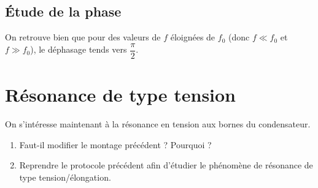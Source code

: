 \documentclass[a4paper,french,bookmarks]{article}
\begin{document}
\subsection{Étude de la phase}

\noafter
%
%
\nobefore\yesafter
%
\begin{expcom}
    On retrouve bien que pour des valeurs de $f$ éloignées de $f_0$ (donc $f \ll f_0$ et $f \gg f_0$), le déphasage tends vers $\dfrac{\pi}{2}$.
\end{expcom}
%
\yesbefore

\section{Résonance de type tension}

On s’intéresse maintenant à la résonance en tension aux bornes du condensateur.

\begin{enumerate}
    \item Faut-il modifier le montage précédent ? Pourquoi ?
    
    
    \item Reprendre le protocole précédent afin d’étudier le phénomène de résonance de type tension/élongation.
    
\end{enumerate}
\end{document}
